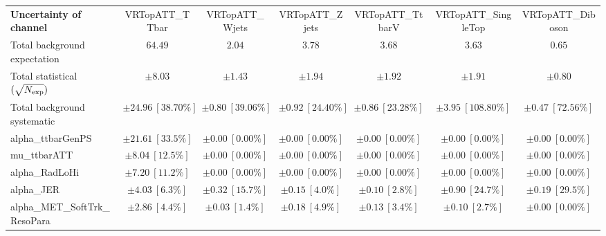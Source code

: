 
\begin{sidewaystable}
\begin{center}
\setlength{\tabcolsep}{0.0pc}
\begin{tabular*}{\textwidth}{@{\extracolsep{\fill}}lcccccc}
\noalign{\smallskip}\hline\noalign{\smallskip}
{\bf Uncertainty of channel}                                    & VRTopATT\_TTbar            & VRTopATT\_Wjets            & VRTopATT\_Zjets            & VRTopATT\_TtbarV            & VRTopATT\_SingleTop            & VRTopATT\_Diboson            \\
\noalign{\smallskip}\hline\noalign{\smallskip}
Total background expectation             &  $64.49$        &  $2.04$        &  $3.78$        &  $3.68$        &  $3.63$        &  $0.65$       \\
\noalign{\smallskip}\hline\noalign{\smallskip}
Total statistical $(\sqrt{N_{\rm exp}})$              & $\pm 8.03$        & $\pm 1.43$        & $\pm 1.94$        & $\pm 1.92$        & $\pm 1.91$        & $\pm 0.80$       \\
Total background systematic               & $\pm 24.96\ [38.70\%] $        & $\pm 0.80\ [39.06\%] $        & $\pm 0.92\ [24.40\%] $        & $\pm 0.86\ [23.28\%] $        & $\pm 3.95\ [108.80\%] $        & $\pm 0.47\ [72.56\%] $             \\
\noalign{\smallskip}\hline\noalign{\smallskip}
\noalign{\smallskip}\hline\noalign{\smallskip}
alpha\_ttbarGenPS         & $\pm 21.61\ [33.5\%] $          & $\pm 0.00\ [0.00\%] $          & $\pm 0.00\ [0.00\%] $          & $\pm 0.00\ [0.00\%] $          & $\pm 0.00\ [0.00\%] $          & $\pm 0.00\ [0.00\%] $       \\
mu\_ttbarATT         & $\pm 8.04\ [12.5\%] $          & $\pm 0.00\ [0.00\%] $          & $\pm 0.00\ [0.00\%] $          & $\pm 0.00\ [0.00\%] $          & $\pm 0.00\ [0.00\%] $          & $\pm 0.00\ [0.00\%] $       \\
alpha\_RadLoHi         & $\pm 7.20\ [11.2\%] $          & $\pm 0.00\ [0.00\%] $          & $\pm 0.00\ [0.00\%] $          & $\pm 0.00\ [0.00\%] $          & $\pm 0.00\ [0.00\%] $          & $\pm 0.00\ [0.00\%] $       \\
alpha\_JER         & $\pm 4.03\ [6.3\%] $          & $\pm 0.32\ [15.7\%] $          & $\pm 0.15\ [4.0\%] $          & $\pm 0.10\ [2.8\%] $          & $\pm 0.90\ [24.7\%] $          & $\pm 0.19\ [29.5\%] $       \\
alpha\_MET\_SoftTrk\_ResoPara         & $\pm 2.86\ [4.4\%] $          & $\pm 0.03\ [1.4\%] $          & $\pm 0.18\ [4.9\%] $          & $\pm 0.13\ [3.4\%] $          & $\pm 0.10\ [2.7\%] $          & $\pm 0.00\ [0.00\%] $       \\

\end{tabular*}
\end{center}
\end{sidewaystable}
